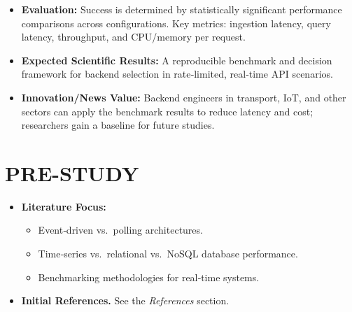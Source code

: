 \documentclass[11pt]{article}
\begin{document}
\begin{itemize}[leftmargin=*, label={}]
  \item %
    \textbf{Evaluation:} Success is determined by statistically significant performance comparisons across configurations. Key metrics: ingestion latency, query latency, throughput, and CPU/memory per request.

  
  \item %
    \textbf{Expected Scientific Results:} A reproducible benchmark and decision framework for backend selection in rate‑limited, real‑time API scenarios.

  
  \item %
    \textbf{Innovation/News Value:} Backend engineers in transport, IoT, and other sectors can apply the benchmark results to reduce latency and cost; researchers gain a baseline for future studies.

\end{itemize}

\section*{PRE-STUDY}

\begin{itemize}[leftmargin=*, label={}]
  \item \textbf{Literature Focus:}
        \begin{itemize}
            \item Event‑driven vs.~polling architectures.
            \item Time‑series vs.~relational vs.~NoSQL database performance.
            \item Benchmarking methodologies for real‑time systems.
        \end{itemize}
  \item \textbf{Initial References.} See the \emph{References} section.
\end{itemize}
\end{document}
